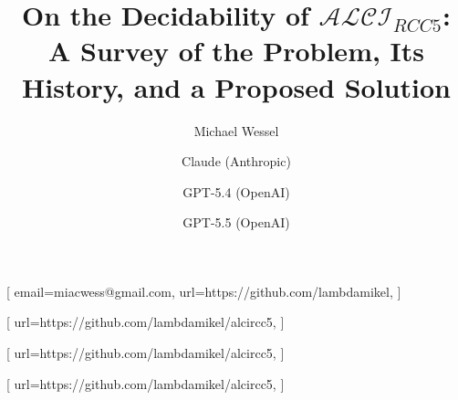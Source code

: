 \documentclass[
]{ceurart}
\theoremstyle{definition}
\newcommand{\ALCIRCC}[1]{\ensuremath{\mathcal{ALCI}_{\mathit{RCC#1}}}}
\begin{document}

\makeatletter
\providecommand\ceurConference@name{}
\makeatother

\title{On the Decidability of $\ALCIRCC{5}$:
  A Survey of the Problem, Its History, and a Proposed Solution}
\makeatletter
{}
\makeatother

\author[1]{Michael Wessel}[%
email=miacwess@gmail.com,
url=https://github.com/lambdamikel,
]
\cormark[1]
\address[1]{University of Hamburg (doctoral work, 2002/2003)}

\author[2]{Claude (Anthropic)}[%
url=https://github.com/lambdamikel/alcircc5,
]
\address[2]{Anthropic, San Francisco, CA, USA}

\author[3]{GPT-5.4 (OpenAI)}[%
url=https://github.com/lambdamikel/alcircc5,
]
\address[3]{OpenAI, San Francisco, CA, USA}

\author[4]{GPT-5.5 (OpenAI)}[%
url=https://github.com/lambdamikel/alcircc5,
]
\address[4]{OpenAI, San Francisco, CA, USA}

\end{document}
